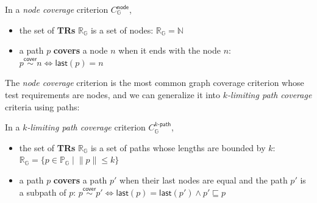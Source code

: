 \documentclass[acmsmall,review,screen]{acmart}
\newcommand{\name}[1]{\textsf{#1}}
\newcommand{\graph}{\mathbb{G}}
\newcommand{\nodeset}{\mathbb{N}}
\newcommand{\node}{n}
\newcommand{\patset}[1]{\mathbb{P}_{#1}}
\newcommand{\pat}{p}
\newcommand{\getlast}{\name{last}}
\newcommand{\subpath}{\sqsubseteq}
\newcommand{\cover}{\overset{\name{cover}}{\sim}}
\newcommand{\trset}[1]{\mathbb{R}_{#1}}
\newcommand{\cov}[1]{C_{#1}}
\newcommand{\nodecov}[1]{\cov{#1}^{\name{node}}}
\newcommand{\kpathcov}[2]{\cov{#2}^{{#1}\name{-path}}}
\newcommand{\norm}[1]{\lVert{#1}\rVert}
\begin{document}

\begin{definition}\label{def:node-cov} In a \textit{node
  coverage} criterion $\nodecov{\graph}$,
  \begin{itemize}
    \item the set of \textbf{TRs} $\trset{\graph}$ is a set of nodes:
      $  \trset{\graph} = \nodeset $
    \item a path $\pat$ \textbf{covers} a node $\node$ when it ends with the
      node $\node$:
      $  \pat \cover \node \iff \getlast(\pat) = \node $
  \end{itemize}
\end{definition}


The \textit{node coverage} criterion is the most common graph coverage criterion
whose test requirements are nodes, and we can generalize it into
\textit{$k$-limiting path coverage} criteria using paths:


\begin{definition}\label{def:k-path-cov}
  In a \textit{$k$-limiting path coverage} criterion $\kpathcov{k}{\graph}$,
  \begin{itemize}
    \item the set of \textbf{TRs} $\trset{\graph}$ is a set of
      paths whose lengths are bounded by $k$:
$
        \trset{\graph} = \{ \pat \in \patset{\graph} \mid \norm{\pat} \leq k \}
$
    \item a path $\pat$ \textbf{covers} a path $\pat'$ when their last nodes are
      equal and the path $\pat'$ is a subpath of $\pat$:
$
        \pat \cover \pat'
        \iff
        \getlast(\pat) = \getlast(\pat') \wedge \pat' \subpath \pat
$
  \end{itemize}
\end{definition}

\end{document}
